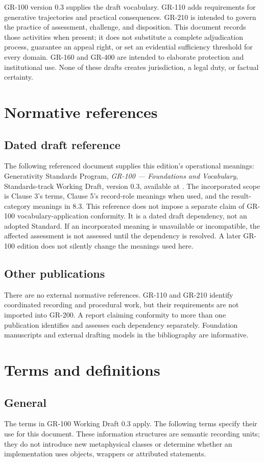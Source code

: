 \documentclass[11pt,a4paper]{article}
\begin{document}
GR-100 version 0.3 supplies the draft vocabulary. GR-110 adds requirements for generative trajectories and practical consequences. GR-210 is intended to govern the practice of assessment, challenge, and disposition. This document records those activities when present; it does not substitute a complete adjudication process, guarantee an appeal right, or set an evidential sufficiency threshold for every domain. GR-160 and GR-400 are intended to elaborate protection and institutional use. None of these drafts creates jurisdiction, a legal duty, or factual certainty.

\section{Normative references}
\subsection{Dated draft reference}
The following referenced document supplies this edition's operational meanings: Generativity Standards Program, \emph{GR-100 --- Foundations and Vocabulary}, Standards-track Working Draft, version 0.3, available at . The incorporated scope is Clause 3's terms, Clause 5's record-role meanings when used, and the result-category meanings in 8.3. This reference does not impose a separate claim of GR-100 vocabulary-application conformity. It is a dated draft dependency, not an adopted Standard. If an incorporated meaning is unavailable or incompatible, the affected assessment is not assessed until the dependency is resolved. A later GR-100 edition does not silently change the meanings used here.

\subsection{Other publications}
There are no external normative references. GR-110 and GR-210 identify coordinated recording and procedural work, but their requirements are not imported into GR-200. A report claiming conformity to more than one publication identifies and assesses each dependency separately. Foundation manuscripts and external drafting models in the bibliography are informative.

\section{Terms and definitions}
\subsection{General}
The terms in GR-100 Working Draft 0.3 apply. The following terms specify their use for this document. These information structures are semantic recording units; they do not introduce new metaphysical classes or determine whether an implementation uses objects, wrappers or attributed statements.
\end{document}
